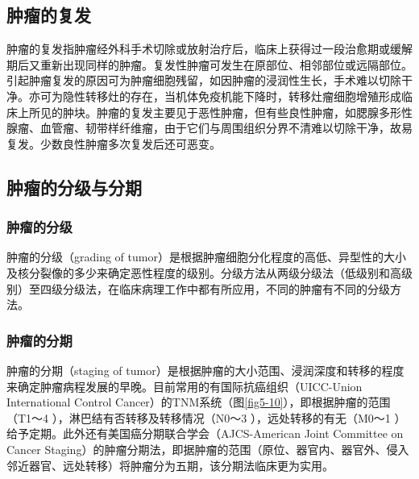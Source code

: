 \subsection{肿瘤的复发}

肿瘤的复发指肿瘤经外科手术切除或放射治疗后，临床上获得过一段治愈期或缓解期后又重新出现同样的肿瘤。复发性肿瘤可发生在原部位、相邻部位或远隔部位。引起肿瘤复发的原因可为肿瘤细胞残留，如因肿瘤的浸润性生长，手术难以切除干净。亦可为隐性转移灶的存在，当机体免疫机能下降时，转移灶瘤细胞增殖形成临床上所见的肿块。肿瘤的复发主要见于恶性肿瘤，但有些良性肿瘤，如腮腺多形性腺瘤、血管瘤、韧带样纤维瘤，由于它们与周围组织分界不清难以切除干净，故易复发。少数良性肿瘤多次复发后还可恶变。

\subsection{肿瘤的分级与分期}

\subsubsection{肿瘤的分级}

肿瘤的分级（grading of
tumor）是根据肿瘤细胞分化程度的高低、异型性的大小及核分裂像的多少来确定恶性程度的级别。分级方法从两级分级法（低级别和高级别）至四级分级法，在临床病理工作中都有所应用，不同的肿瘤有不同的分级方法。

\subsubsection{肿瘤的分期}

肿瘤的分期（staging of
tumor）是根据肿瘤的大小范围、浸润深度和转移的程度来确定肿瘤病程发展的早晚。目前常用的有国际抗癌组织（UICC-Union
International Control
Cancer）的TNM系统（图\ref{fig5-10}），即根据肿瘤的范围（T{1～4}
），淋巴结有否转移及转移情况（N{0～3} ），远处转移的有无（M{0～1}
）给予定期。此外还有美国癌分期联合学会（AJCS-American Joint Committee on
Cancer
Staging）的肿瘤分期法，即据肿瘤的范围（原位、器官内、器官外、侵入邻近器官、远处转移）将肿瘤分为五期，该分期法临床更为实用。

